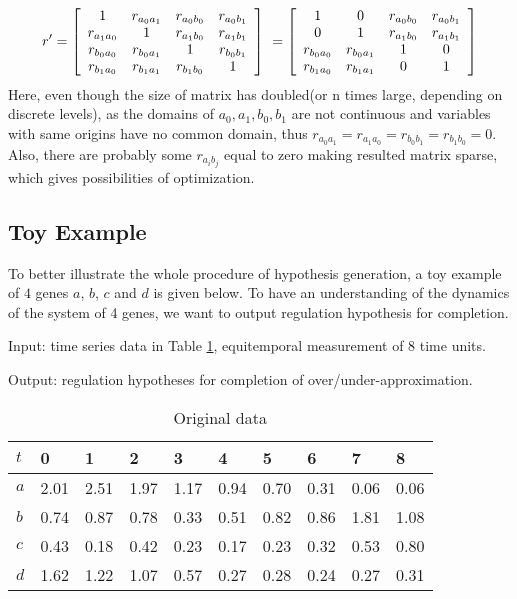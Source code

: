 $$r'=\left[
\begin{array}{*{20}c}
1 & r_{a_0a_1}& r_{a_0b_0}&r_{a_0b_1}\\
r_{a_1a_0} & 1& r_{a_1b_0}&r_{a_1b_1}\\
r_{b_0a_0} & r_{b_0a_1}& 1&r_{b_0b_1}\\
r_{b_1a_0} & r_{b_1a_1}& r_{b_1b_0}&1\\
\end{array}
\right]\ =\left[\begin{array}{*{20}c}
1 & 0& r_{a_0b_0}&r_{a_0b_1}\\
0 & 1& r_{a_1b_0}&r_{a_1b_1}\\
r_{b_0a_0} & r_{b_0a_1}& 1&0\\
r_{b_1a_0} & r_{b_1a_1}& 0&1\\
\end{array}\right]$$
Here, even though the size of matrix has doubled(or n times large, depending on discrete levels), as the domains of $a_0,a_1,b_0,b_1$ are not continuous and variables with same origins have no common domain, thus $r_{a_0a_1}=r_{a_1a_0}=r_{b_0b_1}=r_{b_1b_0}=0$. Also, there are probably some $r_{a_ib_j}$ equal to zero making resulted matrix sparse, which gives possibilities of optimization.
\subsection{Toy Example}
To better illustrate the whole procedure of hypothesis generation, a toy example of $4$ genes $a$, $b$, $c$ and $d$ is given below. To have an understanding of the dynamics of the system of 4 genes, we want to output regulation hypothesis for completion.

Input: time series data in Table \ref{TyTable1}, equitemporal measurement of 8 time units.

Output: regulation hypotheses for completion of over/under-approximation.

\begin{table}[!ht]
\centering
\begin{tabular}{*{10}{l}}
$t$&0&1&2&3&4&5&6&7&8\\
\hline
$a$&2.01&2.51&1.97&1.17&0.94&0.70&0.31&0.06&0.06\\
$b$&0.74&0.87&0.78&0.33&0.51&0.82&0.86&1.81&1.08\\
$c$&0.43&0.18&0.42&0.23&0.17&0.23&0.32&0.53&0.80\\
$d$&1.62&1.22&1.07&0.57&0.27&0.28&0.24&0.27&0.31
\end{tabular} 
\caption{Original data}\label{TyTable1}
\end{table}



